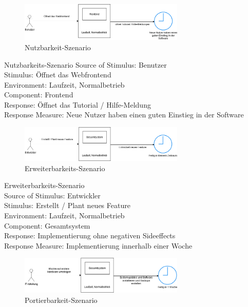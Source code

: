 \begin{figure}[tbh]
  \centering
  \includegraphics[width=0.7\textwidth]{Graphics/Nutzbarkeit.png}
  \caption{Nutzbarkeit-Szenario}
  \label{fig:Qualitaet3}
\end{figure}



Nutzbarkeits-Szenario
Source of Stimulus: Benutzer\\
Stimulus: Öffnet das Webfrontend\\
Environment: Laufzeit, Normalbetrieb\\
Component: Frontend\\
Response: Öffnet das Tutorial / Hilfe-Meldung\\
Response Measure: Neue Nutzer haben einen guten Einstieg in der Software\\





\begin{figure}[tbh]
  \centering
  \includegraphics[width=0.7\textwidth]{Graphics/Erweiterbarkeit.png}
  \caption{Erweiterbarkeits-Szenario}
  \label{fig:Qualitaet3}
\end{figure}


Erweiterbarkeits-Szenario\\
Source of Stimulus: Entwickler\\
Stimulus: Erstellt / Plant neues Feature\\
Environment: Laufzeit, Normalbetrieb\\
Component: Gesamtsystem\\
Response: Implementierung ohne negativen Sideeffects\\
Response Measure: Implementierung innerhalb einer Woche \\



\begin{figure}[tbh]
  \centering
  \includegraphics[width=0.7\textwidth]{Graphics/Portierbarkeit.png}
  \caption{Portierbarkeit-Szenario}
  \label{fig:Qualitaet4}
\end{figure}



